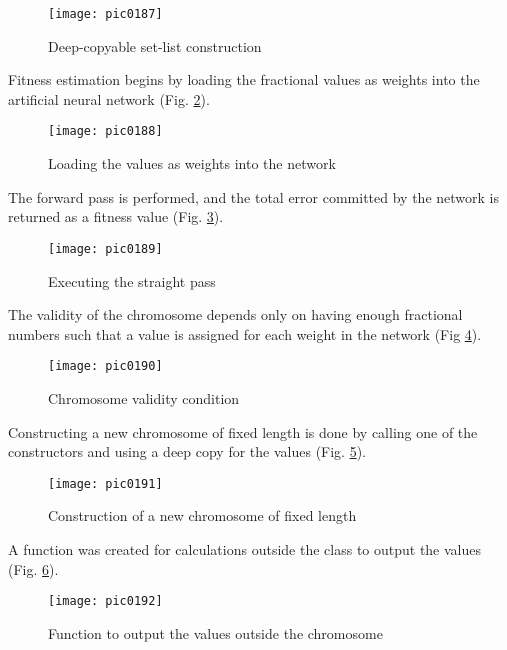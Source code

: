 \begin{figure}[h]
\centering
\texttt{[image: pic0187]}
\caption{Deep-copyable set-list construction}
\label{fig:pic0187}
\end{figure}
\FloatBarrier

Fitness estimation begins by loading the fractional values as weights into the artificial neural network (Fig. \ref{fig:pic0188}).

\begin{figure}[h]
\centering
\texttt{[image: pic0188]}
\caption{Loading the values as weights into the network}
\label{fig:pic0188}
\end{figure}
\FloatBarrier

The forward pass is performed, and the total error committed by the network is returned as a fitness value (Fig. \ref{fig:pic0189}).

\begin{figure}[h]
\centering
\texttt{[image: pic0189]}
\caption{Executing the straight pass}
\label{fig:pic0189}
\end{figure}
\FloatBarrier

The validity of the chromosome depends only on having enough fractional numbers such that a value is assigned for each weight in the network (Fig \ref{fig:pic0190}).

\begin{figure}[h]
\centering
\texttt{[image: pic0190]}
\caption{Chromosome validity condition}
\label{fig:pic0190}
\end{figure}
\FloatBarrier

Constructing a new chromosome of fixed length is done by calling one of the constructors and using a deep copy for the values (Fig. \ref{fig:pic0191}).

\begin{figure}[h]
\centering
\texttt{[image: pic0191]}
\caption{Construction of a new chromosome of fixed length}
\label{fig:pic0191}
\end{figure}
\FloatBarrier

A function was created for calculations outside the class to output the values (Fig. \ref{fig:pic0192}).

\begin{figure}[h]
\centering
\texttt{[image: pic0192]}
\caption{Function to output the values outside the chromosome}
\label{fig:pic0192}
\end{figure}
\FloatBarrier

